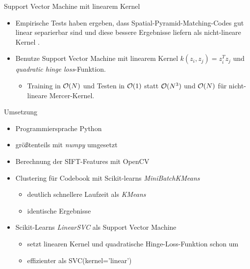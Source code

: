 \begin{frame}[t, fragile]{Support Vector Machine mit linearem Kernel}
	\begin{itemize}
		\item Empirische Tests haben ergeben, dass Spatial-Pyramid-Matching-Codes gut linear separierbar sind und diese bessere Ergebnisse liefern als nicht-lineare Kernel \cite{lsp06}.
		\item Benutze Support Vector Machine mit linearem Kernel $k(z_i, z_j) = z_i^Tz_j$ und \emph{quadratic hinge loss}-Funktion.
		\begin{itemize}
			\item Training in $\mathcal{O}(N)$ und Testen in $\mathcal{O}(1)$ statt $\mathcal{O}(N^3)$ und $\mathcal{O}(N)$ für nicht-lineare Mercer-Kernel.
		\end{itemize}
	\end{itemize}
\end{frame}

\begin{frame}[t, fragile]{Umsetzung}
	\begin{itemize}
		\item Programmiersprache Python
		\item größtenteils mit \emph{numpy} umgesetzt
		\item Berechnung der SIFT-Features mit OpenCV
		\item Clustering für Codebook mit Scikit-learns \emph{MiniBatchKMeans} \cite{sklearn}
		\begin{itemize}
			\item deutlich schnellere Laufzeit als \emph{KMeans}
			\item identische Ergebnisse
		\end{itemize}
		\item Scikit-Learns \emph{LinearSVC} als Support Vector Machine \cite{sklearn}
		\begin{itemize}
			\item setzt linearen Kernel und quadratische Hinge-Loss-Funktion schon um
			\item effizienter als SVC(kernel='linear')
		\end{itemize}
	\end{itemize}
\end{frame}